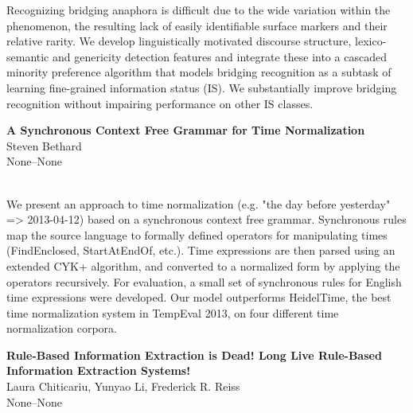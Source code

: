 \documentclass[twoside,makeidx]{book}
\begin{document}
\nopagebreak%
\noindent%
{\small Recognizing bridging anaphora is difficult due to the wide variation   within the phenomenon, the resulting lack of easily identifiable   surface markers and their relative rarity. We develop linguistically   motivated discourse structure, lexico-semantic and genericity   detection features and integrate these into a cascaded minority   preference algorithm that models bridging recognition as a subtask   of learning fine-grained information status (IS).  We substantially   improve bridging recognition without impairing performance on other   IS classes.}
\par\vspace{2em}\noindent%
\begin{minipage}{\linewidth}%
\begin{center}
\textbf{\normalsize A Synchronous Context Free Grammar for Time Normalization}\\
\normalsize  Steven Bethard\\
{\small None--None}\\
\end{center}
\end{minipage}\\[0.5em]
\nopagebreak%
\noindent%
{\small We present an approach to time normalization (e.g. "the day before yesterday" => 2013-04-12) based on a synchronous context free grammar. Synchronous rules map the source language to formally defined operators for manipulating times (FindEnclosed, StartAtEndOf, etc.). Time expressions are then parsed using an extended CYK+ algorithm, and converted to a normalized form by applying the operators recursively. For evaluation, a small set of synchronous rules for English time expressions were developed. Our model outperforms HeidelTime, the best time normalization system in TempEval 2013, on four different time normalization corpora.}
\par\vspace{2em}\noindent%
\begin{minipage}{\linewidth}%
\begin{center}
\textbf{\normalsize Rule-Based Information Extraction is Dead! Long Live Rule-Based Information Extraction Systems!}\\
\normalsize  Laura Chiticariu,  Yunyao Li,  Frederick R. Reiss\\
{\small None--None}\\
\end{center}
\end{minipage}\\[0.5em]
\end{document}

